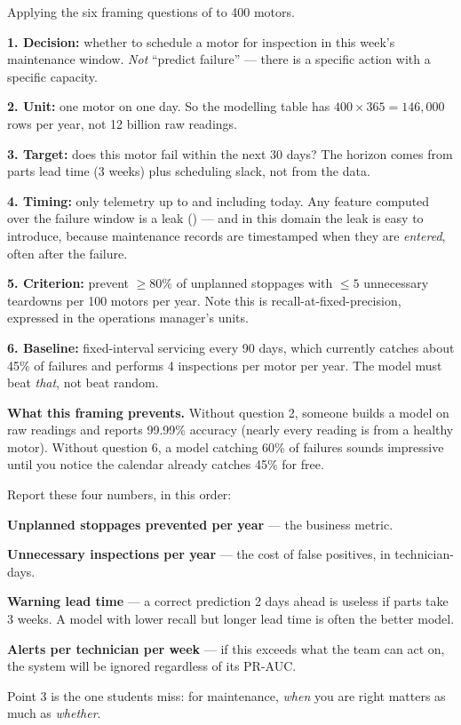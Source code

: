 \begin{worked}
Applying the six framing questions of  to 400 motors.

\smallskip
\textbf{1. Decision:} whether to schedule a motor for inspection in this week's
maintenance window. \emph{Not} ``predict failure'' --- there is a specific action
with a specific capacity.

\textbf{2. Unit:} one motor on one day. So the modelling table has
$400 \times 365 = 146{,}000$ rows per year, not 12 billion raw readings.

\textbf{3. Target:} does this motor fail within the next 30 days? The horizon comes
from parts lead time (3 weeks) plus scheduling slack, not from the data.

\textbf{4. Timing:} only telemetry up to and including today. Any feature computed
over the failure window is a leak () --- and in this domain the
leak is easy to introduce, because maintenance records are timestamped when they
are \emph{entered}, often after the failure.

\textbf{5. Criterion:} prevent $\geq 80\%$ of unplanned stoppages with $\leq 5$
unnecessary teardowns per 100 motors per year. Note this is recall-at-fixed-precision,
expressed in the operations manager's units.

\textbf{6. Baseline:} fixed-interval servicing every 90 days, which currently
catches about 45\% of failures and performs 4 inspections per motor per year. The
model must beat \emph{that}, not beat random.

\smallskip
\textbf{What this framing prevents.} Without question 2, someone builds a model on
raw readings and reports 99.99\% accuracy (nearly every reading is from a healthy
motor). Without question 6, a model catching 60\% of failures sounds impressive
until you notice the calendar already catches 45\% for free.
\end{worked}

\begin{alertbox}
Report these four numbers, in this order:
\begin{tightnum}
  \item \textbf{Unplanned stoppages prevented per year} --- the business metric.
  \item \textbf{Unnecessary inspections per year} --- the cost of false positives,
        in technician-days.
  \item \textbf{Warning lead time} --- a correct prediction 2 days ahead is useless
        if parts take 3 weeks. A model with lower recall but longer lead time is
        often the better model.
  \item \textbf{Alerts per technician per week} --- if this exceeds what the team
        can act on, the system will be ignored regardless of its PR-AUC.
\end{tightnum}
Point 3 is the one students miss: for maintenance, \emph{when} you are right
matters as much as \emph{whether}.
\end{alertbox}

